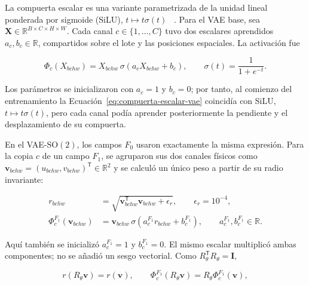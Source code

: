 La compuerta escalar es una variante parametrizada de la unidad lineal
ponderada por sigmoide (SiLU), \(t\mapsto t\sigma(t)\)
~\cite{elfwing_silu_2018}. Para el VAE base, sea
\(\mathbf X\in\mathbb R^{B\times C\times H\times W}\). Cada canal
\(c\in\{1,\ldots,C\}\) tuvo dos escalares aprendidos \(a_c,b_c\in\mathbb R\),
compartidos sobre el lote y las posiciones espaciales. La activación fue

\begin{equation}
    \Phi_c(X_{bchw})
      =X_{bchw}\,\sigma\!\left(a_cX_{bchw}+b_c\right),
    \qquad
    \sigma(t)=\frac{1}{1+e^{-t}}.
    \label{eq:compuerta-escalar-vae}
\end{equation}

Los parámetros se inicializaron con \(a_c=1\) y \(b_c=0\); por tanto, al
comienzo del entrenamiento la Ecuación~\eqref{eq:compuerta-escalar-vae}
coincidía con SiLU, \(t\mapsto t\sigma(t)\), pero cada canal podía aprender
posteriormente la pendiente y el desplazamiento de su compuerta.

En el VAE-\(\mathrm{SO}(2)\), los campos \(F_0\) usaron exactamente la misma
expresión. Para la copia \(c\) de un campo \(F_1\), se agruparon sus dos
canales físicos como
\(\mathbf v_{bchw}=(u_{bchw},v_{bchw})^{\mathsf T}\in\mathbb R^2\) y se
calculó un único peso a partir de su radio invariante:

\begin{equation}
    \begin{aligned}
    r_{bchw}
       &=\sqrt{\mathbf v_{bchw}^{\mathsf T}\mathbf v_{bchw}
               +\epsilon_r},\qquad \epsilon_r=10^{-4},\\
    \Phi^{F_1}_c(\mathbf v_{bchw})
       &=\mathbf v_{bchw}\,
         \sigma\!\left(a^{F_1}_c r_{bchw}+b^{F_1}_c\right),
         \qquad a^{F_1}_c,b^{F_1}_c\in\mathbb R.
    \end{aligned}
    \label{eq:compuerta-radial-f1}
\end{equation}

Aquí también se inicializó \(a^{F_1}_c=1\) y \(b^{F_1}_c=0\). El mismo escalar
multiplicó ambas componentes; no se añadió un sesgo vectorial. Como
\(R_\theta^{\mathsf T}R_\theta=\mathbf I\),

\begin{equation}
    r(R_\theta\mathbf v)=r(\mathbf v),\qquad
    \Phi^{F_1}_c(R_\theta\mathbf v)
      =R_\theta\Phi^{F_1}_c(\mathbf v),
    \label{eq:equivarianza-compuerta-radial}
\end{equation}

